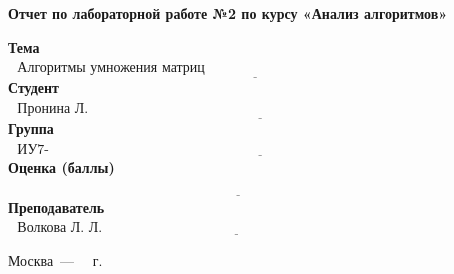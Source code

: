 \begin{titlepage}
	\begin{center}
		\Large\textbf{Отчет по лабораторной работе №2 по курсу «Анализ алгоритмов»}
	\end{center}
	

	\noindent\textbf{Тема} $\underline{\text{~~Алгоритмы умножения матриц~~~~~~~~~~~~~~~~~~~~~~~~~~~~~~~~~~~~~~~~~~~~~~~~~~~~~~~~~~~~~~~~}}$\newline\newline
	\noindent\textbf{Студент} $\underline{\text{~~Пронина Л. Ю.~~~~~~~~~~~~~~~~~~~~~~~~~~~~~~~~~~~~~~~~~~~~~~~~~~~~~~~~~~~~~~~~~~~~~~~~~~~~~~~~~~~~~~~~~}}$\newline\newline
	\noindent\textbf{Группа} $\underline{\text{~~ИУ7-54Б~~~~~~~~~~~~~~~~~~~~~~~~~~~~~~~~~~~~~~~~~~~~~~~~~~~~~~~~~~~~~~~~~~~~~~~~~~~~~~~~~~~~~~~~~~~~~~~~~}}$\newline\newline
	\noindent\textbf{Оценка (баллы)} $\underline{\text{~~~~~~~~~~~~~~~~~~~~~~~~~~~~~~~~~~~~~~~~~~~~~~~~~~~~~~~~~~~~~~~~~~~~~~~~~~~~~~~~~~~~~~~~~~~~~~~~~~~}}$\newline\newline
	\noindent\textbf{Преподаватель} $\underline{\text{~~Волкова Л. Л.~~~~~~~~~~~~~~~~~~~~~~~~~~~~~~~~~~~~~~~~~~~~~~~~~~~~~~~~~~~~~~~~~~~~~~~~~~~~~~}}$\newline
	
	\begin{center}
		\vfill
		Москва~---~\the\year
		~г.
	\end{center}
	\restoregeometry
\end{titlepage}

